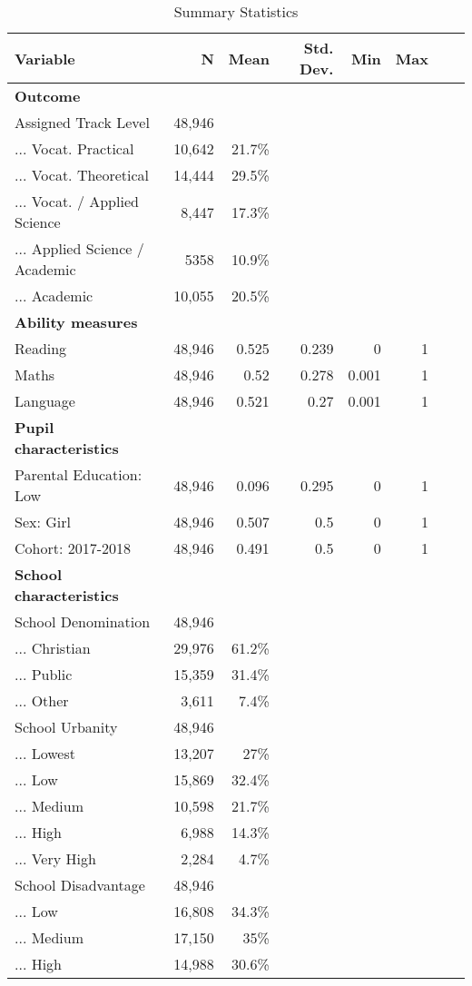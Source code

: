 \begin{table}[!t] \centering
\caption{Summary Statistics}
\label{table: descriptives}
\footnotesize
\begin{tabular}{lrrrrrrr}
\toprule
\toprule
Variable & N & Mean & Std. Dev. & Min & Max \\ 
\midrule
\textbf{Outcome} \\ 
Assigned Track Level & 48,946 &  &  &   &  \\ 
... Vocat. Practical & 10,642 & 21.7\% &  &  &  \\ 
... Vocat. Theoretical & 14,444 & 29.5\% &  &  &  \\ 
... Vocat. / Applied Science & 8,447 & 17.3\% &  & &  \\ 
... Applied Science / Academic & 5358 & 10.9\% &   &  \\ 
... Academic & 10,055 & 20.5\% &  &  &  \\
\midrule
\textbf{Ability measures} \\
Reading & 48,946 & 0.525 & 0.239 & 0  & 1 \\ 
Maths & 48,946 & 0.52 & 0.278 & 0.001  & 1 \\ 
Language & 48,946 & 0.521 & 0.27 & 0.001 & 1 \\ 
\midrule
\textbf{Pupil characteristics} \\
Parental Education: Low & 48,946 & 0.096 & 0.295 & 0 & 1 \\ 
Sex: Girl & 48,946 & 0.507 & 0.5 & 0 & 1 \\ 
Cohort: 2017-2018 & 48,946 & 0.491 & 0.5 & 0 & 1\\ 
\midrule
\textbf{School characteristics} \\
School Denomination & 48,946 &  &  &  &  \\ 
... Christian & 29,976 & 61.2\% &  &  &  \\ 
... Public & 15,359 & 31.4\% &  &  &  \\ 
... Other & 3,611 & 7.4\% &  &  &  \\ 
School Urbanity & 48,946 &  &  &  &  \\ 
... Lowest & 13,207 & 27\% &  &  &  \\ 
... Low & 15,869 & 32.4\% &  &  &  \\ 
... Medium & 10,598 & 21.7\% &  &  &  \\ 
... High & 6,988 & 14.3\% &  &  &  \\ 
... Very High & 2,284 & 4.7\% &  &  &  \\ 
School Disadvantage & 48,946 &  &  &  &  \\ 
... Low & 16,808 & 34.3\% &  &  &  \\ 
... Medium & 17,150 & 35\% &  &  &  \\ 
... High & 14,988 & 30.6\% &  &  &  \\ 
\bottomrule
\bottomrule
\end{tabular}
\end{table}

